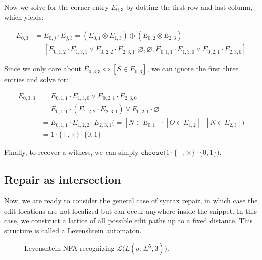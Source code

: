 \documentclass[sigplan,review,acmsmall,nonacm,screen,anonymous]{acmart}\settopmatter{printfolios=false,printccs=false,printacmref=false}
\begin{document}
\noindent Now we solve for the corner entry $E_{0, 3}$ by dotting the first row and last column, which yields:\vspace{-8pt}

\begin{align*}
  E_{0, 3} &= E_{0, j} \cdot E_{j, 3} = (E_{0, 1} \otimes E_{1, 3}) \oplus (E_{0, 2} \otimes E_{2, 3})\\
  &= [E_{0, 1, 2} \cdot E_{1, 3, 1} \lor E_{0, 2, 2} \cdot E_{2, 3, 1}, \varnothing, \varnothing, E_{0, 1, 1} \cdot E_{1, 3, 0} \lor E_{0, 2, 1} \cdot E_{2, 3, 0}]
\end{align*}

\noindent Since we only care about $E_{0, 3, 3} \Leftrightarrow [S \in E_{0, 3}]$, we can ignore the first three entries and solve for:\vspace{-8pt}

\begin{align*}
  E_{0, 3, 3} &= E_{0, 1, 1} \cdot E_{1, 3, 0} \lor E_{0, 2, 1} \cdot E_{2, 3, 0}\\
  &= E_{0, 1, 1} \cdot (E_{1, 2, 2} \cdot E_{2, 3, 1}) \lor E_{0, 2, 1} \cdot \varnothing\\
  &= E_{0, 1, 1} \cdot E_{1, 2, 2} \cdot E_{2, 3, 1} \big(= [N \in E_{0, 1}] \cdot [O \in E_{1, 2}] \cdot [N \in E_{2, 3}]\big)\\
  &= 1 \cdot \{+, \times\} \cdot \{0, 1\}
\end{align*}

\noindent Finally, to recover a witness, we can simply $\texttt{choose}\big(1 \cdot \{+, \times\} \cdot \{0, 1\}\big)$.

\subsection{Repair as intersection}\label{sec:repair_ex}

Now, we are ready to consider the general case of syntax repair, in which case the edit locations are not localized but can occur anywhere inside the snippet. In this case, we construct a lattice of all possible edit paths up to a fixed distance. This structure is called a Levenshtein automaton.

\begin{figure}
  \vspace{-0.3cm}
  \begin{center}
    
  \end{center}
  \caption{Levenshtein NFA recognizing $\mathcal{L}\big(L(\sigma: \Sigma^5, 3)\big)$.}\label{fig:lev_nfa}
  \vspace{-0.5cm}
\end{figure}
\end{document}
